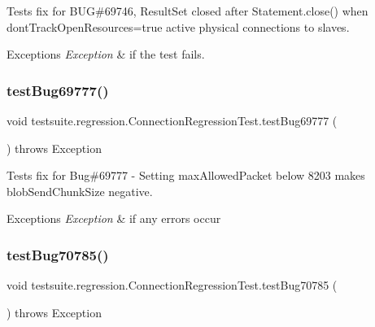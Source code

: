 Tests fix for B\+UG\#69746, Result\+Set closed after Statement.\+close() when dont\+Track\+Open\+Resources=true active physical connections to slaves.


\begin{DoxyExceptions}{Exceptions}
{\em Exception} & if the test fails. \\
\hline
\end{DoxyExceptions}
\mbox{\label{classtestsuite_1_1regression_1_1_connection_regression_test_a6d62956aba90350317ed7d34d3d6eb39}} 
\subsubsection{\texorpdfstring{test\+Bug69777()}{testBug69777()}}
{\footnotesize\ttfamily void testsuite.\+regression.\+Connection\+Regression\+Test.\+test\+Bug69777 (\begin{DoxyParamCaption}{ }\end{DoxyParamCaption}) throws Exception}

Tests fix for Bug\#69777 -\/ Setting max\+Allowed\+Packet below 8203 makes blob\+Send\+Chunk\+Size negative.


\begin{DoxyExceptions}{Exceptions}
{\em Exception} & if any errors occur \\
\hline
\end{DoxyExceptions}
\mbox{\label{classtestsuite_1_1regression_1_1_connection_regression_test_a2e9ffad8504db4b26677d74c5f5b0a65}} 
\subsubsection{\texorpdfstring{test\+Bug70785()}{testBug70785()}}
{\footnotesize\ttfamily void testsuite.\+regression.\+Connection\+Regression\+Test.\+test\+Bug70785 (\begin{DoxyParamCaption}{ }\end{DoxyParamCaption}) throws Exception}

